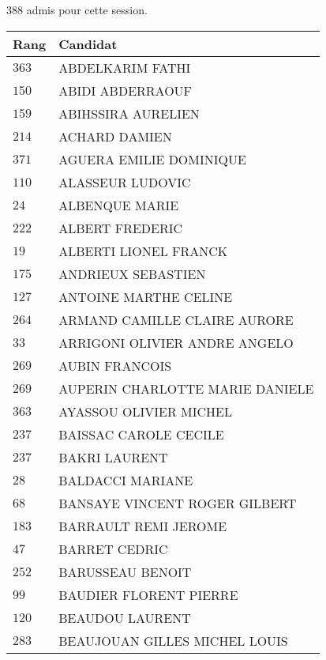 




  $388$ admis pour cette session.

  \begin{xltabular}{\linewidth}{|l|X|}
    \hline
    \textbf{Rang} & \textbf{Candidat} \\
    \hline
    $363$ & ABDELKARIM FATHI \\
    \hline
    $150$ & ABIDI ABDERRAOUF \\
    \hline
    $159$ & ABIHSSIRA AURELIEN \\
    \hline
    $214$ & ACHARD DAMIEN \\
    \hline
    $371$ & AGUERA EMILIE DOMINIQUE \\
    \hline
    $110$ & ALASSEUR LUDOVIC \\
    \hline
    $24$ & ALBENQUE MARIE \\
    \hline
    $222$ & ALBERT FREDERIC \\
    \hline
    $19$ & ALBERTI LIONEL FRANCK \\
    \hline
    $175$ & ANDRIEUX SEBASTIEN \\
    \hline
    $127$ & ANTOINE MARTHE CELINE \\
    \hline
    $264$ & ARMAND CAMILLE CLAIRE AURORE \\
    \hline
    $33$ & ARRIGONI OLIVIER ANDRE ANGELO \\
    \hline
    $269$ & AUBIN FRANCOIS \\
    \hline
    $269$ & AUPERIN CHARLOTTE MARIE DANIELE \\
    \hline
    $363$ & AYASSOU OLIVIER MICHEL \\
    \hline
    $237$ & BAISSAC CAROLE CECILE \\
    \hline
    $237$ & BAKRI LAURENT \\
    \hline
    $28$ & BALDACCI MARIANE \\
    \hline
    $68$ & BANSAYE VINCENT ROGER GILBERT \\
    \hline
    $183$ & BARRAULT REMI JEROME \\
    \hline
    $47$ & BARRET CEDRIC \\
    \hline
    $252$ & BARUSSEAU BENOIT \\
    \hline
    $99$ & BAUDIER FLORENT PIERRE \\
    \hline
    $120$ & BEAUDOU LAURENT \\
    \hline
    $283$ & BEAUJOUAN GILLES MICHEL LOUIS \\

\end{xltabular}
